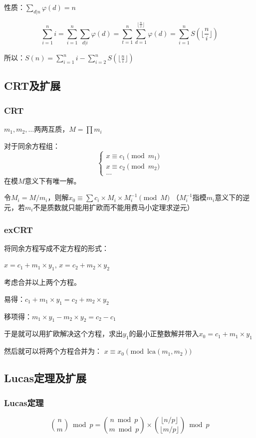 \documentclass[twocolumn,a4]{article}
\begin{document}
性质：$\sum_{d|n}\varphi(d)=n$

$$\sum_{i=1}^{n}i=\sum_{i=1}^{n}\sum_{d|i}\varphi(d)=\sum_{t=1}^{n}\sum_{d=1}^{\lfloor\frac{n}{t}\rfloor}\varphi(d)=\sum_{i=1}^{n}S(\lfloor\frac{n}{i}\rfloor)$$

所以：$S(n)=\sum_{i=1}^n i-\sum_{i=2}^{n}S(\lfloor \frac{n}{i}\rfloor)$
\subsection{CRT及扩展}
\subsubsection{CRT}
$m_1,m_2,\dots$两两互质，$M=\prod m_i$

对于同余方程组：
$$
\begin{cases}
x\equiv c_1 \pmod {m_1} \\
x\equiv c_2 \pmod {m_2} \\
\dots
\end{cases}
$$
在模$M$意义下有唯一解。

令$M_i = M/m_i$，则解$x_0 \equiv \sum c_i\times M_i \times M_i^{-1} \pmod M$
（$M_i^{-1}$指模$m_i$意义下的逆元，若$m_i$不是质数就只能用扩欧而不能用费马小定理求逆元）

\subsubsection{exCRT}
将同余方程写成不定方程的形式：

$x=c_1+m_1\times y_1$, $x=c_2+m_2\times y_2$

考虑合并以上两个方程。

易得：$c_1+m_1\times y_1=c_2+m_2\times y_2$

移项得：$m_1\times y_1-m_2\times y_2=c_2-c_1$

于是就可以用扩欧解决这个方程，求出$y_1$的最小正整数解并带入$x_0=c_1+m_1\times y_1$

然后就可以将两个方程合并为： $x\equiv x_0\pmod {\mathrm{lca}(m_1,m_2)}$

\subsection{Lucas定理及扩展}
\subsubsection{Lucas定理}
$$\binom{n}{m}\bmod p = \binom{n \bmod p}{m \bmod p} \times \binom{\lfloor n/p\rfloor}{\lfloor m/p\rfloor} \bmod p$$
\end{document}
